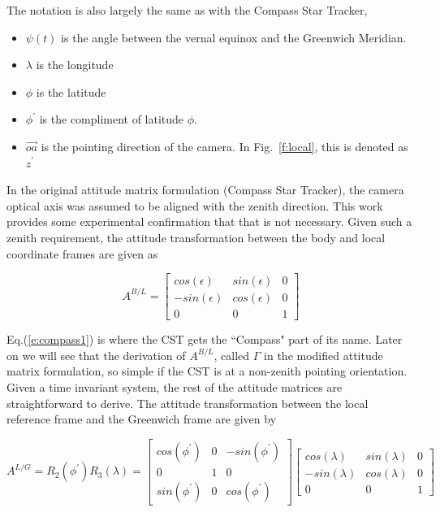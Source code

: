 \documentclass[12pt,a4paper]{book}
\begin{document}
The notation is also largely the same as with the Compass Star Tracker, 

\begin{itemize}
\item $\psi(t)$ is the angle between the vernal equinox and the Greenwich Meridian.
\item $\lambda$ is the longitude
\item $\phi$ is the latitude
\item $\phi^{'}$ is the compliment of latitude $\phi$.
\item $\vec{oa}$ is the pointing direction of the camera.  In Fig.~\ref{f:local}, this is denoted as $z^{'}$
\end{itemize}

In the original attitude matrix formulation (Compass Star Tracker), the camera optical axis was assumed to be aligned with the zenith direction.  This work provides some experimental confirmation that that is not necessary.  Given such a zenith requirement, the attitude transformation between the body and local coordinate frames are given as

\begin{equation}
A^{B/L} = \begin{bmatrix}
cos(\epsilon) & sin(\epsilon) & 0\\
-sin(\epsilon) & cos(\epsilon) & 0 \\
0 & 0 & 1
\end{bmatrix}
\label{e:compass1}
\end{equation}

Eq.(\ref{e:compass1}) is where the CST gets the ``Compass" part of its name.  Later on we will see that the derivation of $A^{B/L}$, called $\Gamma$ in the modified attitude matrix formulation, so simple if the CST is at a non-zenith pointing orientation.  Given a time invariant system, the rest of the attitude matrices are straightforward to derive.  The attitude transformation between the local reference frame and the Greenwich frame are given by

\begin{equation}
A^{L/G} = R_{2}(\phi^{'})R_{3}(\lambda) = \begin{bmatrix}
cos(\phi^{'}) & 0 & -sin(\phi^{'})\\
0 & 1 & 0 \\
sin(\phi^{'}) & 0 & cos(\phi^{'})
\end{bmatrix}\begin{bmatrix}
cos(\lambda) & sin(\lambda) & 0\\
-sin(\lambda) & cos(\lambda) & 0\\
0 & 0 & 1
\end{bmatrix}
\end{equation}
\end{document}
